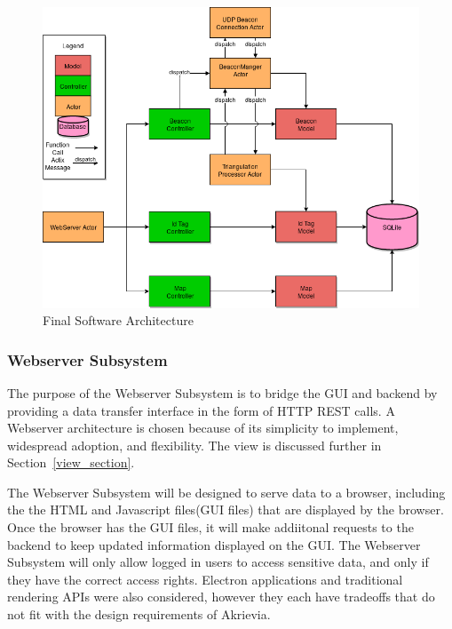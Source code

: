 \bigskip
\begin{figure}[H]
	\centering
    \includegraphics[scale=0.55]{images/prototype_software_arch.png}
    \caption{Final Software Architecture}
    \label{software_final_arch}
\end{figure}

\bigskip
\subsubsection{Webserver Subsystem}
The purpose of the Webserver Subsystem is to bridge the GUI and backend by providing a data transfer interface in the form of HTTP REST calls.
A Webserver architecture is chosen because of its simplicity to implement, widespread adoption, and flexibility.
The view is discussed further in Section~\ref{view_section}.

\bigskip
The Webserver Subsystem will be designed to serve data to a browser, including the the HTML and Javascript files(GUI files) that are displayed by the browser.
Once the browser has the GUI files, it will make addiitonal requests to the backend to keep updated information displayed on the GUI.
The Webserver Subsystem will only allow logged in users to access sensitive data, and only if they have the correct access rights.
Electron applications and traditional rendering APIs were also considered, however they each have tradeoffs that do not fit with the design requirements of Akrievia.

